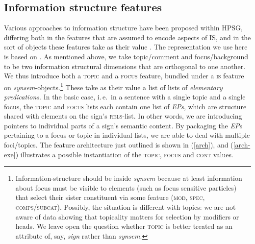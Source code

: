 \begin{exe}
\begin{xlist}[iv.]
\begin{exe}
\begin{xlist}[iv.]
\begin{exe}
\begin{xlist}[iv.]
\subsection{Information structure features}
\label{sec-information-structure-general}

Various approaches to information structure have been proposed within HPSG, differing both in the features that are assumed to encode aspects of IS, and in the sort of objects these features take as their value \cite[among others,][]{EV96a,Wilcock2001a,deKuthy2002a,Paggio2005a-u,Webelhuth2007a-u}. The representation we use here is based on \cite{Bildhauer2008b}. As mentioned above, we take topic/comment and focus/background to be two information structural dimensions that are orthogonal to one another. We thus introduce both a \textsc{topic} and a \textsc{focus} feature, bundled under a \textsc{is} feature on \textit{synsem}-objects.\footnote{Information-structure should be inside \textit{synsem} because at least information about focus must be visible to elements (such as focus sensitive particles) that select their sister constituent via some feature (\textsc{mod}, \textsc{spec}, \textsc{comps}/\textsc{subcat}). Possibly, the situation is different with topics: we are not aware of data showing that topicality matters for selection by modifiers or heads. We leave open the question whether \textsc{topic} is better treated as an attribute of, say, \textit{sign} rather than \textit{synsem}.} These take as their value a list of lists of \textit{elementary predications}. In the basic case, i.\,e.\ in a sentence with a single topic and a single focus, the \textsc{topic} and
\textsc{focus} lists each contain one list of \textit{EPs}, which are structure shared with elements on the sign's \textsc{rels}-list. In other words, we are introducing pointers to individual parts of a sign's semantic content. By packaging the \textit{EP}s pertaining to a focus or topic in individual lists, we are able to deal with multiple foci/topics. The feature architecture just outlined is shown in (\ref{arch}), and (\ref{arch-exe}) illustrates a possible instantiation of the
\textsc{topic}, \textsc{focus} and \textsc{cont} values.



\end{xlist}
\end{exe}
\end{xlist}
\end{exe}
\end{xlist}
\end{exe}
